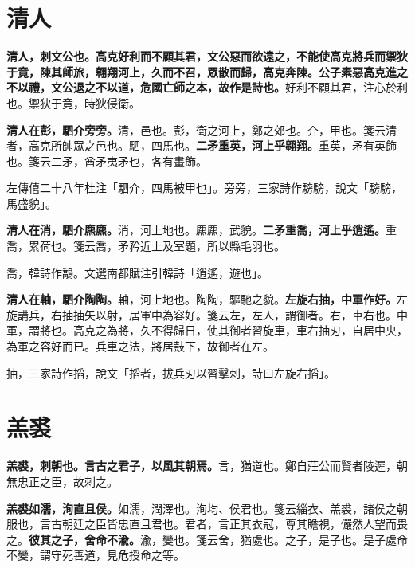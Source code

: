 \section{清人}


\textbf{清人，刺文公也。高克好利而不顧其君，文公惡而欲遠之，不能使高克將兵而禦狄于竟，陳其師旅，翱翔河上，久而不召，眾散而歸，高克奔陳。公子素惡高克進之不以禮，文公退之不以道，危國亡師之本，故作是詩也。}{\footnotesize 好利不顧其君，注心於利也。禦狄于竟，時狄侵衛。}

\textbf{清人在彭，駟介旁旁。}{\footnotesize 清，邑也。彭，衛之河上，鄭之郊也。介，甲也。箋云清者，高克所帥眾之邑也。駟，四馬也。}\textbf{二矛重英，河上乎翱翔。}{\footnotesize 重英，矛有英飾也。箋云二矛，酋矛夷矛也，各有畫飾。}

\begin{quoting}左傳僖二十八年杜注「駟介，四馬被甲也」。旁旁，三家詩作騯騯，說文「騯騯，馬盛貌」。\end{quoting}

\textbf{清人在消，駟介麃麃。}{\footnotesize 消，河上地也。麃麃，武貌。}\textbf{二矛重喬，河上乎逍遙。}{\footnotesize 重喬，累荷也。箋云喬，矛矜近上及室題，所以縣毛羽也。}

\begin{quoting}喬，韓詩作鷮。文選南都賦注引韓詩「逍遙，遊也」。\end{quoting}

\textbf{清人在軸，駟介陶陶。}{\footnotesize 軸，河上地也。陶陶，驅馳之貌。}\textbf{左旋右抽，中軍作好。}{\footnotesize 左旋講兵，右抽抽矢以射，居軍中為容好。箋云左，左人，謂御者。右，車右也。中軍，謂將也。高克之為將，久不得歸日，使其御者習旋車，車右抽刃，自居中央，為軍之容好而已。兵車之法，將居鼓下，故御者在左。}

\begin{quoting}抽，三家詩作搯，說文「搯者，拔兵刃以習擊刺，詩曰左旋右搯」。\end{quoting}

\section{羔裘}


\textbf{羔裘，刺朝也。言古之君子，以風其朝焉。}{\footnotesize 言，猶道也。鄭自莊公而賢者陵遲，朝無忠正之臣，故刺之。}

\textbf{羔裘如濡，洵直且侯。}{\footnotesize 如濡，潤澤也。洵均、侯君也。箋云緇衣、羔裘，諸侯之朝服也，言古朝廷之臣皆忠直且君也。君者，言正其衣冠，尊其瞻視，儼然人望而畏之。}\textbf{彼其之子，舍命不渝。}{\footnotesize 渝，變也。箋云舍，猶處也。之子，是子也。是子處命不變，謂守死善道，見危授命之等。}

